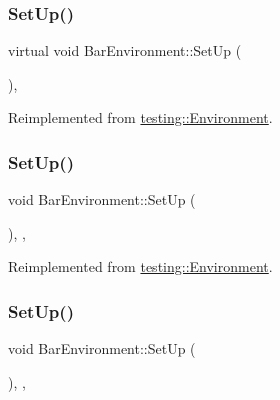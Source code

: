 \subsubsection{\texorpdfstring{SetUp()}{SetUp()}\hspace{0.1cm}{\footnotesize\ttfamily [1/3]}}
{\footnotesize\ttfamily virtual void Bar\+Environment\+::\+Set\+Up (\begin{DoxyParamCaption}{ }\end{DoxyParamCaption})\hspace{0.3cm}{\ttfamily [inline]}, {\ttfamily [virtual]}}



Reimplemented from \mbox{\hyperlink{classtesting_1_1_environment_a1bf8cafaa9d4eba9feb98655ee434eb3}{testing\+::\+Environment}}.

\mbox{\label{class_bar_environment_a8c525317fe8067f5000475cf4689da09}} 
\subsubsection{\texorpdfstring{SetUp()}{SetUp()}\hspace{0.1cm}{\footnotesize\ttfamily [2/3]}}
{\footnotesize\ttfamily void Bar\+Environment\+::\+Set\+Up (\begin{DoxyParamCaption}{ }\end{DoxyParamCaption})\hspace{0.3cm}{\ttfamily [inline]}, {\ttfamily [override]}, {\ttfamily [virtual]}}



Reimplemented from \mbox{\hyperlink{classtesting_1_1_environment_a1bf8cafaa9d4eba9feb98655ee434eb3}{testing\+::\+Environment}}.

\mbox{\label{class_bar_environment_a8c525317fe8067f5000475cf4689da09}} 
\subsubsection{\texorpdfstring{SetUp()}{SetUp()}\hspace{0.1cm}{\footnotesize\ttfamily [3/3]}}
{\footnotesize\ttfamily void Bar\+Environment\+::\+Set\+Up (\begin{DoxyParamCaption}{ }\end{DoxyParamCaption})\hspace{0.3cm}{\ttfamily [inline]}, {\ttfamily [override]}, {\ttfamily [virtual]}}



